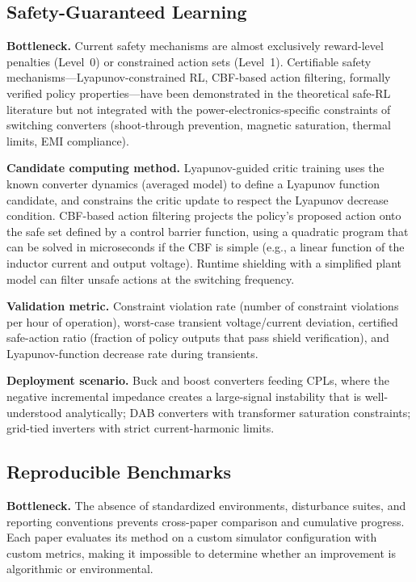 \documentclass[manuscript,screen,review]{acmart}
\begin{document}
\subsection{Safety-Guaranteed Learning}

\textbf{Bottleneck.} Current safety mechanisms are almost exclusively reward-level penalties (Level~0) or constrained action sets (Level~1).
Certifiable safety mechanisms---Lyapunov-constrained RL, CBF-based action filtering, formally verified policy properties---have been demonstrated in the theoretical safe-RL literature but not integrated with the power-electronics-specific constraints of switching converters (shoot-through prevention, magnetic saturation, thermal limits, EMI compliance).

\textbf{Candidate computing method.}
Lyapunov-guided critic training uses the known converter dynamics (averaged model) to define a Lyapunov function candidate, and constrains the critic update to respect the Lyapunov decrease condition.
CBF-based action filtering projects the policy's proposed action onto the safe set defined by a control barrier function, using a quadratic program that can be solved in microseconds if the CBF is simple (e.g., a linear function of the inductor current and output voltage).
Runtime shielding with a simplified plant model can filter unsafe actions at the switching frequency.

\textbf{Validation metric.}
Constraint violation rate (number of constraint violations per hour of operation), worst-case transient voltage/current deviation, certified safe-action ratio (fraction of policy outputs that pass shield verification), and Lyapunov-function decrease rate during transients.

\textbf{Deployment scenario.}
Buck and boost converters feeding CPLs, where the negative incremental impedance creates a large-signal instability that is well-understood analytically; DAB converters with transformer saturation constraints; grid-tied inverters with strict current-harmonic limits.

\subsection{Reproducible Benchmarks}

\textbf{Bottleneck.}
The absence of standardized environments, disturbance suites, and reporting conventions prevents cross-paper comparison and cumulative progress.
Each paper evaluates its method on a custom simulator configuration with custom metrics, making it impossible to determine whether an improvement is algorithmic or environmental.
\end{document}

